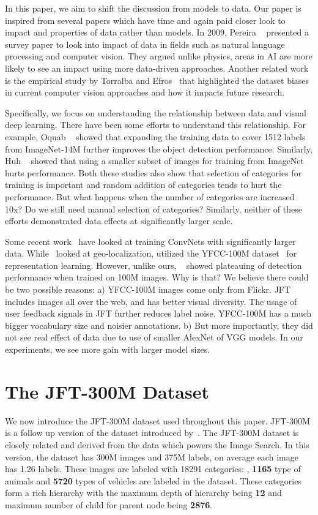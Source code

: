 \documentclass[10pt,twocolumn,letterpaper]{article}
\begin{document}
In this paper, we aim to shift the discussion from models to data. Our paper is inspired from several papers which have time and again paid closer look to impact and properties of data rather than models. In 2009, Pereira \etal~\cite{Pereira} presented a survey paper to look into impact of data in fields such as natural language processing and computer vision. They argued unlike physics, areas in AI are more likely to see an impact using more data-driven approaches. Another related work is the empirical study by Torralba and Efros~\cite{TorralbaEfros} that highlighted the dataset biases in current computer vision approaches and how it impacts future research.

Specifically, we focus on understanding the relationship between data and visual deep learning. There have been some efforts to understand this relationship. For example, Oquab \etal~\cite{OquabCVPR14} showed that expanding the training data to cover 1512 labels from ImageNet-14M further improves the object detection performance. Similarly, Huh \etal~\cite{HuhArXiv} showed that using a smaller subset of images for training from ImageNet hurts performance. Both these studies also show that selection of categories for training is important and random addition of categories tends to hurt the performance. But what happens when the number of categories are increased 10x? Do we still need manual selection of categories? Similarly, neither of these efforts demonstrated data effects at significantly larger scale.

Some recent work~\cite{JoulinWeakly,PlaNet} have looked at training ConvNets with significantly larger data. While~\cite{PlaNet} looked at geo-localization, \cite{JoulinWeakly} utilized the YFCC-100M dataset~\cite{YFCC100M} for representation learning. However, unlike ours, ~\cite{JoulinWeakly} showed plateauing of detection performance when trained on 100M images. Why is that? We believe there could be two possible reasons: a) YFCC-100M images come only from Flickr. JFT includes images all over the web, and has better visual diversity. The usage of user feedback signals in JFT further reduces label noise. YFCC-100M has a much bigger vocabulary size and noisier annotations. b) But more importantly, they did not see 
real effect of data due to use of smaller AlexNet of VGG models. In our experiments, we see more gain with larger model sizes.

\section{The JFT-300M Dataset}
We now introduce the JFT-300M dataset used throughout this paper. JFT-300M is a follow up version of the dataset introduced by~\cite{Hinton, Chollet}. The JFT-300M dataset is closely related and derived from the data which powers the Image Search. In this version, the dataset has 300M images and 375M labels, on average each image has 1.26 labels. These images are labeled with 18291 categories: \eg, {\bf 1165} type of animals and {\bf 5720} types of vehicles are labeled in the dataset. These categories form a rich hierarchy with the maximum depth of hierarchy being {\bf 12} and maximum number of child for parent node being {\bf 2876}.
\end{document}
